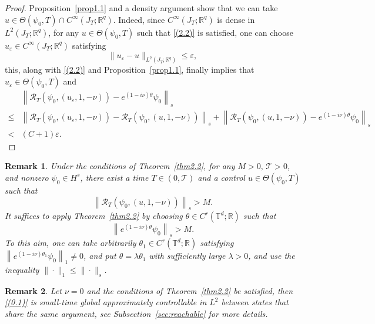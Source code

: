 \documentclass[review]{elsarticle}
\newtheorem{remark}{Remark}[section]
\theoremstyle{dotless}
\def \leq{\leqslant}
\numberwithin{equation}{section}
\begin{document}
\begin{proof}
Proposition~\ref{prop1.1} and a density argument show that we can take $u \in \Theta\left(\psi_0, T\right) \cap C^{\infty}\left(J_T ; \mathbb{R}^q\right)$. Indeed, since $C^{\infty}\left(J_T ; \mathbb{R}^q\right)$ is dense in $L^2\left(J_T ; \mathbb{R}^q\right)$, for any $u\in  \Theta\left(\psi_0, T\right) $ such that  \eqref{(2.2)} is satisfied, one can choose $u_\varepsilon\in C^{\infty}\left(J_T ; \mathbb{R}^q\right)$ satisfying
\begin{equation*}
	\|u_\varepsilon - u\|_{L^2\left(J_T ; \mathbb{R}^q\right)}\leq \varepsilon,
\end{equation*}
this, along with \eqref{(2.2)} and  Proposition~\ref{prop1.1}, finally implies that $u_\varepsilon\in  \Theta\left(\psi_0, T\right) $ and
\begin{equation*}
	\begin{aligned}
	&\left\|\mathcal{R}_T\left(\psi_0, (u_\varepsilon,1,-\nu)\right)-e^{(1-i\nu) \theta} \psi_0\right\|_s \\
	\leq 	&\left\|\mathcal{R}_T\left(\psi_0, (u_\varepsilon,1,-\nu)\right)- \mathcal{R}_T\left(\psi_0, (u,1,-\nu)\right)\right\|_s + \left\|\mathcal{R}_T\left(\psi_0, (u,1,-\nu)\right)-e^{(1-i\nu) \theta} \psi_0\right\|_s\\
	< &( C+1 )\varepsilon.
	\end{aligned}
\end{equation*}
\end{proof}
\begin{remark}
Under the conditions of Theorem~\ref{thm2.2}, for any $M>0, \,\mathcal{T}>0$, and nonzero $\psi_0 \in H^s$, there exist a time $T \in(0, \mathcal{T})$ and a control $u \in \Theta\left(\psi_0, T\right)$ such that
$$
\left\|\mathcal{R}_T\left(\psi_0, \left(u,1,-\nu\right)\right)\right\|_s>M.
$$
It suffices to apply Theorem~\ref{thm2.2} by choosing $\theta \in C^r\left(\mathbb{T}^d ; \mathbb{R}\right)$ such that
$$
\left\|e^{(1-i\nu) \theta} \psi_0\right\|_s>M.
$$
To this aim, one can take arbitrarily $\theta_1 \in C^r\left(\mathbb{T}^d ; \mathbb{R}\right)$ satisfying $\left\|e^{(1-i\nu) \theta_1} \psi_0\right\|_1 \neq 0$, and put $\theta=\lambda \theta_1$ with sufficiently large $\lambda>0$, and use the inequality $\|\cdot\|_1 \leq\|\cdot\|_s$.
\end{remark}
\begin{remark}
Let $ \nu=0$ and the conditions of Theorem~\ref{thm2.2} be satisfied, then \eqref{(0.1)} is small-time global approximately controllable in $L^2$ between states that share the same argument, see Subsection~\ref{sec:reachable} for more details.
\end{remark}
\end{document}
